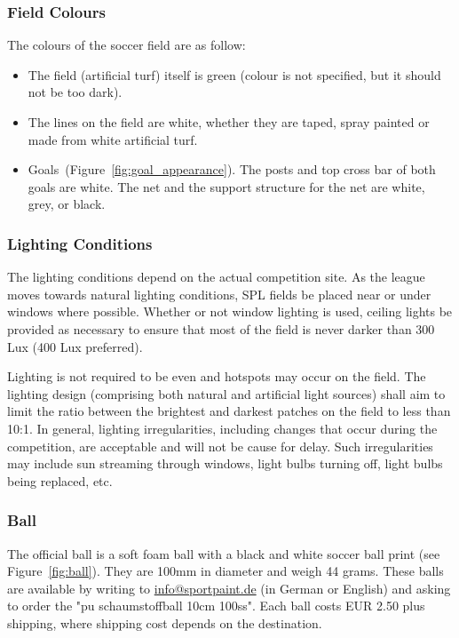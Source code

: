 \subsubsection{Field Colours}
\label{sec:field_colors}
The colours of the soccer field are as follow:

\begin{itemize}
	\item The field (artificial turf) itself is green (colour is not specified, but it should not be too dark).
	
	\item The lines on the field are white, whether they are taped, spray painted or made from white artificial turf.
	
	\item Goals~(\cf Figure~\ref{fig:goal_appearance}). The posts and top cross bar of both goals are white. The net and the support structure for the net are white, grey, or black.
\end{itemize}

\subsubsection{Lighting Conditions}
\label{sec:lightConditions}
The lighting conditions depend on the actual competition site. As the league moves towards natural lighting conditions, SPL fields  be placed near or under windows where possible. Whether or not window lighting is used, ceiling lights  be provided as necessary to ensure that most of the field is never darker than 300 Lux (400 Lux preferred).

Lighting is not required to be even and hotspots may occur on the field. The lighting design (comprising both natural and artificial light sources) shall aim to limit the ratio between the brightest and darkest patches on the field to less than 10:1. In general, lighting irregularities, including changes that occur during the competition, are acceptable and will not be cause for delay. Such irregularities may include sun streaming through windows, light bulbs turning off, light bulbs being replaced, etc.

\subsubsection{Ball}
\label{sec:ball}

The official ball is a soft foam ball with a black and white soccer ball print (see Figure~\ref{fig:ball}). They are 100mm in diameter and weigh 44 grams. These balls are available by writing to \url{info@sportpaint.de} (in German or English) and asking to order the "pu schaumstoffball 10cm 100ss".  Each ball costs EUR 2.50 plus shipping, where shipping cost depends on the destination.

